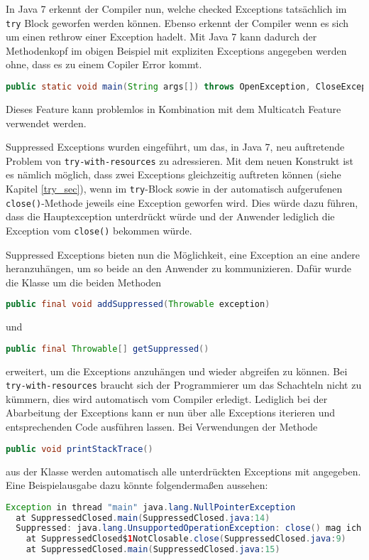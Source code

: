 \documentclass[times, 10pt,twocolumn]{article}
\begin{document}
In Java 7 erkennt der Compiler nun, welche checked Exceptions tatsächlich im \texttt{try} Block geworfen werden können. Ebenso erkennt der Compiler wenn es sich um einen rethrow einer Exception hadelt. Mit Java 7 kann dadurch der Methodenkopf im obigen Beispiel mit expliziten Exceptions angegeben werden ohne, dass es zu einem Copiler Error kommt\cite{sbJ7exeptions}.

\begin{lstlisting}[language=java,breaklines=true]
public static void main(String args[]) throws OpenException, CloseException
\end{lstlisting}

Dieses Feature kann problemlos in Kombination mit dem Multicatch Feature verwendet werden.

\label{supp_exception_subsec}
Suppressed Exceptions wurden eingeführt, um das, in Java 7, neu auftretende Problem von \texttt{try-with-resources} zu adressieren.
Mit dem neuen Konstrukt ist es nämlich möglich, dass zwei Exceptions gleichzeitig auftreten können (siehe Kapitel \ref{try_sec}), wenn im
\texttt{try}-Block sowie in der automatisch aufgerufenen \texttt{close()}-Methode jeweils eine Exception geworfen wird. Dies würde
dazu führen, dass die Hauptexception unterdrückt würde und der Anwender lediglich die Exception vom \texttt{close()} bekommen würde.

Suppressed Exceptions bieten nun die Möglichkeit, eine Exception an eine andere heranzuhängen, um so beide an den Anwender zu
kommunizieren. Dafür wurde die Klasse  um die beiden Methoden 
\begin{lstlisting}[language=java,breaklines=true]
public final void addSuppressed(Throwable exception)
\end{lstlisting}
und 
\begin{lstlisting}[language=java,breaklines=true]
public final Throwable[] getSuppressed()
\end{lstlisting}
erweitert, um die Exceptions anzuhängen und wieder abgreifen zu können. 
Bei \texttt{try-with-resources} braucht sich der Programmierer um das Schachteln nicht zu kümmern, dies wird 
automatisch vom Compiler erledigt.\cite{sbJ7coin} Lediglich bei der Abarbeitung der Exceptions kann er nun über
alle Exceptions iterieren und entsprechenden Code ausführen lassen. Bei Verwendungen der Methode
\begin{lstlisting}[language=java,breaklines=true]
public void printStackTrace()
\end{lstlisting}
aus der Klasse  werden automatisch alle unterdrückten Exceptions mit angegeben. Eine Beispielausgabe dazu könnte
folgendermaßen aussehen\cite{javainsel2}:
\begin{lstlisting}[language=java,breaklines=true]
Exception in thread "main" java.lang.NullPointerException
  at SuppressedClosed.main(SuppressedClosed.java:14)
  Suppressed: java.lang.UnsupportedOperationException: close() mag ich nicht
    at SuppressedClosed$1NotClosable.close(SuppressedClosed.java:9)
    at SuppressedClosed.main(SuppressedClosed.java:15)
\end{lstlisting}
\end{document}
